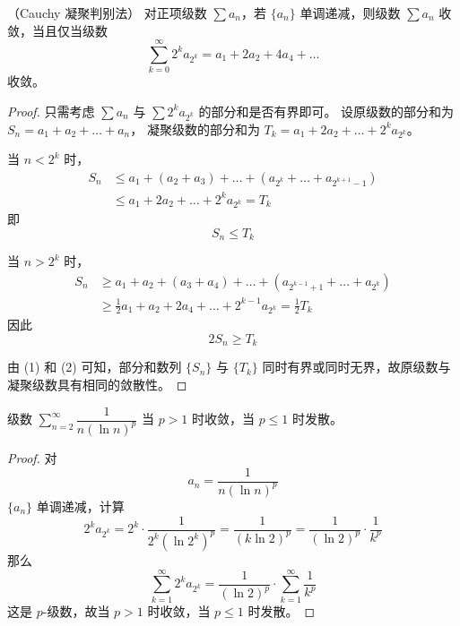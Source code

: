 \begin{proposition}
	（Cauchy 凝聚判别法）
	对正项级数 $\sum a_n$，若 $\{a_n\}$ 单调递减，则级数 $\sum a_n$ 收敛，当且仅当级数
	\[
	\sum_{k=0}^{\infty} 2^k a_{2^k} = a_1 + 2a_2 + 4a_4 + \dots
	\]
	收敛。
\end{proposition}
\begin{proof}
	只需考虑 $\sum a_n$ 与 $\sum 2^k a_{2^k}$ 的部分和是否有界即可。
	设原级数的部分和为 $S_n = a_1 + a_2 + \dots + a_n$，
	凝聚级数的部分和为 $T_k = a_1 + 2a_2 + \dots + 2^k a_{2^k}$。
	
	当 $n < 2^k$ 时，
	\[
	\begin{aligned}
		S_n &\le a_1 + (a_2 + a_3) + \dots + (a_{2^k} + \dots + a_{2^{k+1}-1}) \\
		&\le a_1 + 2a_2 + \dots + 2^k a_{2^k} = T_k
	\end{aligned}
	\]
	即
	\[
	S_n \le T_k \tag{1}
	\]
	
	当 $n > 2^k$ 时，
	\[
	\begin{aligned}
		S_n &\ge a_1 + a_2 + (a_3 + a_4) + \dots + (a_{2^{k-1}+1} + \dots + a_{2^k}) \\
		&\ge \frac{1}{2}a_1 + a_2 + 2a_4 + \dots + 2^{k-1}a_{2^k} = \frac{1}{2}T_k
	\end{aligned}
	\]
	因此
	\[
	2S_n \ge T_k \tag{2}
	\]
	
	由 (1) 和 (2) 可知，部分和数列 $\{S_n\}$ 与 $\{T_k\}$ 同时有界或同时无界，故原级数与凝聚级数具有相同的敛散性。
\end{proof}
\begin{lemma}\label{级数1/nlnn}
	级数 $\sum\limits_{n=2}^{\infty} \dfrac{1}{n(\ln n)^p}$ 当 $p>1$ 时收敛，当 $p \le 1$ 时发散。
\end{lemma}
\begin{proof}
	对
	\[
	a_n = \frac{1}{n(\ln n)^p}
	\]
	$\{a_n\}$ 单调递减，计算
	\[
	2^k a_{2^k} = 2^k \cdot \frac{1}{2^k (\ln 2^k)^p} = \frac{1}{(k \ln 2)^p} = \frac{1}{(\ln 2)^p} \cdot \frac{1}{k^p}
	\]
	那么
	\[
	\sum_{k=1}^{\infty} 2^k a_{2^k} = \frac{1}{(\ln 2)^p} \cdot \sum_{k=1}^{\infty} \frac{1}{k^p}
	\]
	这是 $p$-级数，故当 $p > 1$ 时收敛，当 $ p \le 1$ 时发散。
	
\end{proof}

